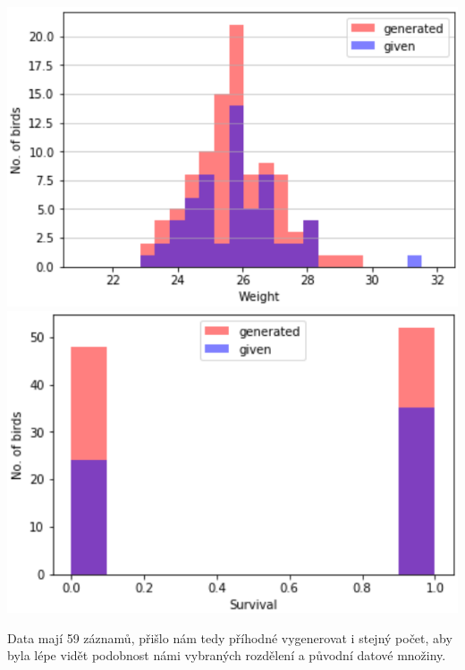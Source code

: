 \documentclass[12pt,a4paper]{article}
\begin{document}
\includegraphics[scale=0.31]{gen_weight_graph2}
\includegraphics[scale=0.31]{gen_survival_graph2}

Data mají 59 záznamů, přišlo nám tedy příhodné vygenerovat i stejný počet, aby byla lépe vidět podobnost námi vybraných rozdělení a původní datové množiny.
\end{document}
